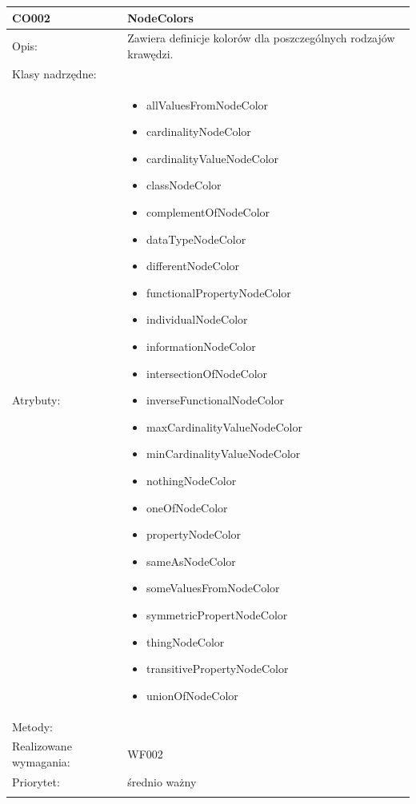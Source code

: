 \documentclass[a4paper,10pt]{article}
\begin{document}
\begin{center}
\begin{longtable}{|m{3cm}|m{9cm}|}
CO002 & NodeColors \\ \hline
Opis: & Zawiera definicje kolorów dla poszczególnych rodzajów krawędzi.   \\ \hline
Klasy nadrzędne: &     \\ \hline
Atrybuty: & \begin{itemize}
 \item allValuesFromNodeColor
 \item cardinalityNodeColor
 \item cardinalityValueNodeColor
 \item classNodeColor
 \item complementOfNodeColor
 \item dataTypeNodeColor
 \item differentNodeColor
 \item functionalPropertyNodeColor
 \item individualNodeColor
 \item informationNodeColor
 \item intersectionOfNodeColor
 \item inverseFunctionalNodeColor
 \item maxCardinalityValueNodeColor
 \item minCardinalityValueNodeColor
 \item nothingNodeColor
 \item oneOfNodeColor
 \item propertyNodeColor
 \item sameAsNodeColor
 \item someValuesFromNodeColor
 \item symmetricPropertNodeColor
 \item thingNodeColor
 \item transitivePropertyNodeColor
 \item unionOfNodeColor 
\end{itemize}
 \\ \hline
Metody: & %
  \\ \hline
Realizowane wymagania: & WF002 \\ \hline
Priorytet: & średnio ważny \\ \hline



\multicolumn{2}{c}{} \\
 \hline


\end{longtable}
\end{center}
\end{document}
